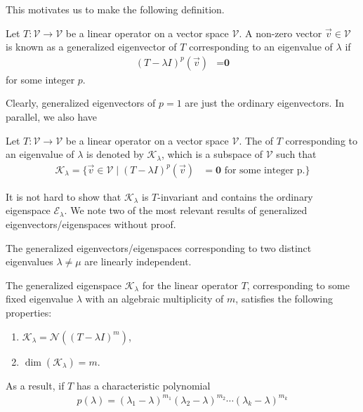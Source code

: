 This motivates us to make the following definition.
\begin{defn}
Let $T: \mathcal{V} \to \mathcal{V}$ be a linear operator on a vector space $\mathcal{V}$. A non-zero vector $\vec{v} \in \mathcal{V}$ is known as a generalized eigenvector of $T$ corresponding to an eigenvalue of $\lambda$ if
\begin{align}
(T - \lambda I)^p(\vec{v}) &= \textbf{0}
\end{align}
for some integer $p$.
\end{defn}
Clearly, generalized eigenvectors of $p=1$ are just the ordinary eigenvectors. In parallel, we also have
\begin{defn}
Let $T: \mathcal{V} \to \mathcal{V}$ be a linear operator on a vector space $\mathcal{V}$. The  of $T$ corresponding to an eigenvalue of $\lambda$ is denoted by $\mathcal{K}_\lambda$, which is a subspace of $\mathcal{V}$ such that
\begin{align}
\mathcal{K}_\lambda = \{\vec{v} \in \mathcal{V} \mid (T - \lambda I)^p(\vec{v}) &= \textbf{0} \text{ for some integer p.}\}
\end{align}
\end{defn}
It is not hard to show that $\mathcal{K}_\lambda$ is $T$-invariant and contains the ordinary eigenspace $\mathcal{E}_\lambda$. We note two of the most relevant results of generalized eigenvectors/eigenspaces without proof.
\begin{proper}
The generalized eigenvectors/eigenspaces corresponding to two distinct eigenvalues $\lambda \neq \mu$ are linearly independent.
\end{proper}
\begin{proper}
The generalized eigenspace $\mathcal{K}_\lambda$ for the linear operator $T$, corresponding to some fixed eigenvalue $\lambda$ with an algebraic multiplicity of $m$, satisfies the following properties:
\begin{enumerate}
    \item $\mathcal{K}_\lambda = \mathcal{N}((T-\lambda I)^m)$,
    \item $\dim(\mathcal{K}_\lambda) = m$.
\end{enumerate}
\end{proper}
As a result, if $T$ has a characteristic polynomial
\begin{align}
p(\lambda) = (\lambda_1-\lambda)^{m_1}(\lambda_2-\lambda)^{m_2}\cdots(\lambda_k-\lambda)^{m_k} \label{eqn:lambdammm}
\end{align}
